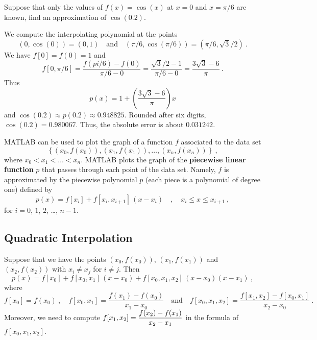 \begin{egg}
Suppose that only the values of $f(x) = \cos(x)$ at $x=0$ and
$x=\pi/6$ are known, find an approximation of $\cos(0.2)$.

We compute the interpolating polynomial at the points
\[
(0,\cos(0))=(0,1) \quad \text{and} \quad
\left(\pi/6, \cos\left(\pi/6\right)\right)
=\left(\pi/6, \sqrt{3}/2\right) \ .
\]
We have $f[0] = f(0) = 1$ and
\[
f[0,\pi/6]= \frac{f(pi/6) - f(0)}{\pi/6-0}
= \frac{\sqrt{3}/2-1}{\pi/6-0} = \frac{3\sqrt{3}-6}{\pi} \ .
\]
Thus
\[
p(x)=1+\left(\frac{3\sqrt{3}-6}{\pi}\right) x
\]
and $\cos(0.2) \approx p(0.2) \approx 0.948825$.  Rounded after six digits,
$\cos(0.2)=0.980067$.  Thus, the absolute error is about $0.031242$.
\label{cos}
\end{egg}

\begin{rmk}
MATLAB can be used to plot the graph of a function $f$ associated to
the data set
\[
\left\{ (x_0,f(x_0)), (x_1,f(x_1)), \ldots , (x_n,f(x_n)) \right\}
\ ,
\]
where $x_0 < x_1 < \ldots < x_n$.   MATLAB plots the graph of
the {\bfseries piecewise linear function}
$p$ that passes through each
point of the data set.  Namely, $f$ is approximated by the piecewise
polynomial $p$ (each piece is a polynomial of degree one) defined by
\[
p(x) = f[x_i]+f[x_i,x_{i+1}]\,(x-x_i) \quad, \quad  x_i \leq x \leq x_{i+1}
\ ,
\]
for $i=0$, $1$, $2$, \ldots, $n-1$.
\label{matlab}
\end{rmk}

\subsection{Quadratic Interpolation}

Suppose that we have the points $(x_0,f(x_0))$, $(x_1,f(x_1))$ and
$(x_2,f(x_2))$ with $x_i\neq x_j$ for $i\neq j$.  Then
\[
p(x)=f[x_0]+f[x_0,x_1]\,(x-x_0)+f[x_0,x_1,x_2]\,(x-x_0)(x-x_1) \ ,
\]
where
\[
f[x_0] = f(x_0) \ , \quad
f[x_0,x_1] =\frac{f(x_1)-f(x_0)}{x_1-x_0} \quad
\text{and} \quad
f[x_0,x_1,x_2] =\frac{f[x_1,x_2]-f[x_0,x_1]}{x_2-x_0} \ .
\]
Moreover, we need to compute
$\displaystyle f[x_1,x_2] =\frac{f(x_2)-f(x_1)}{x_2-x_1}$ in the
formula of $f[x_0,x_1,x_2]$.

